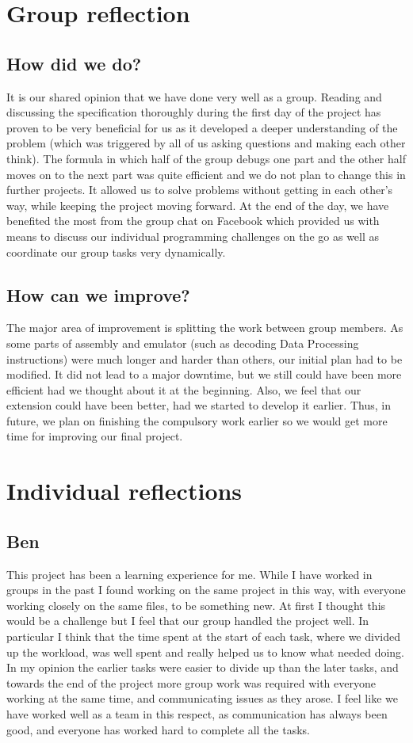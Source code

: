 \documentclass[11pt]{article}
\begin{document}
\section{Group reflection}
\subsection{How did we do?}
It is our shared opinion that we have done very well as a group. Reading and discussing the specification thoroughly during the first day of the project has proven to be very beneficial for us as it developed a deeper understanding of the problem (which was triggered by all of us asking questions and making each other think). The formula in which half of the group debugs one part and the other half moves on to the next part was quite efficient and we do not plan to change this in further projects. It allowed us to solve problems without getting in each other’s way, while keeping the project moving forward. At the end of the day, we have benefited the most from the group chat on Facebook which provided us with means to discuss our individual programming challenges on the go as well as coordinate our group tasks very dynamically. 
\subsection{How can we improve?}
The major area of improvement is splitting the work between group members. As some parts of assembly and emulator (such as decoding Data Processing instructions) were much longer and harder than others, our initial plan had to be modified. It did not lead to a major downtime, but we still could have been more efficient had we thought about it at the beginning. Also, we feel that our extension could have been better, had we started to develop it earlier. Thus, in future, we plan on finishing the compulsory work earlier so we would get more time for improving our final project.
\section{Individual reflections}

\subsection{Ben}
This project has been a learning experience for me. While I have worked in groups in the past I found working on the same project in this way, with everyone working closely on the same files, to be something new. At first I thought this would be a challenge but I feel that our group handled the project well. In particular I think that the time spent at the start of each task, where we divided up the workload, was well spent and really helped us to know what needed doing. In my opinion the earlier tasks were easier to divide up than the later tasks, and towards the end of the project more group work was required with everyone working at the same time, and communicating issues as they arose. I feel like we have worked well as a team in this respect, as communication has always been good, and everyone has worked hard to complete all the tasks.
\end{document}
